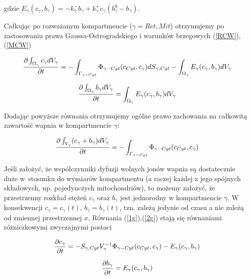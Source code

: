 \noindent gdzie $E_\gamma(c_\gamma,b_\gamma) = - k^{-}_{\gamma} b_{\gamma} + k^{+}_{\gamma} c_\gamma (b^0_{\gamma} -b_{\gamma})$.

\medskip 

\noindent Całkując po rozważanym kompartmencie ($\gamma=Ret,Mit$) otrzymujemy po zastosowaniu prawa Gaussa-Ostrogradskiego i warunków brzegowych (\ref{RCW}),(\ref{MCW}) 


\begin{equation} \label{1g} \frac{\partial \int_{\Omega_\gamma}c_\gamma dV_\gamma}{\partial t} = -\int_{\Gamma_{\gamma-Cyt}} \Phi_{\gamma-Cyt}(c_{Cyt},c_\gamma)
dS_{\gamma,Cyt} - 
\int_{\Omega_\gamma}E_\gamma (c_\gamma, b_\gamma) dV_\gamma \end{equation} 

\begin{equation} \label{2g} \frac{\partial \int_{\Omega_\gamma}b_\gamma dV_\gamma}{\partial t} = \int_{\Omega_\gamma}E_\gamma (c_\gamma, b_\gamma) dV_\gamma \end{equation} 


\noindent Dodając powyższe równania otrzymujemy ogólne prawo zachowania na całkowitą zawartość wapnia w kompartmencie $\gamma$: 

\begin{equation} \label{PRZG}
\frac{\partial \int_{V_\gamma}(c_\gamma + b_\gamma) dV_\gamma}{\partial t} = - \int_{\Gamma_{\gamma-Cyt}} \Phi_{\gamma-Cyt}(c_{Cyt},c_\gamma) 
\end{equation} 

\medskip 

\noindent Jeśli założyć, że współczynniki dyfuzji wolnych jonów wapnia są dostatecznie duże w~stosunku do wymiarów kompartmentu (a raczej każdej z jego spójnych składowych, np. pojedynczych mitochondriów), to możemy założyć, że przestrzenny rozkład stężeń $c_\gamma$ oraz $b_\gamma$ jest jednorodny w kompartmencie $\gamma$. W konsekwencji $c_\gamma=c_\gamma(t)$, $b_\gamma=b_\gamma(t)$, tzn. zależą jedynie od czasu a nie zależą od zmiennej przestrzennej $x$. Równania (\ref{1g}),(\ref{2g}) stają się równaniami różniczkowymi zwyczajnymi postaci

\begin{equation} \label{1gz}
\frac{\partial c_\gamma}{\partial t} =- S_{\gamma,Cyt} V_\gamma^{-1} \Phi_{\gamma-Cyt}(c_{Cyt},c_\gamma)
- E_\gamma (c_\gamma, b_\gamma)
\end{equation} 

\begin{equation} \label{2gz}
\frac{\partial b_\gamma}{\partial t} = E_\gamma (c_\gamma, b_\gamma) 
\end{equation} 

